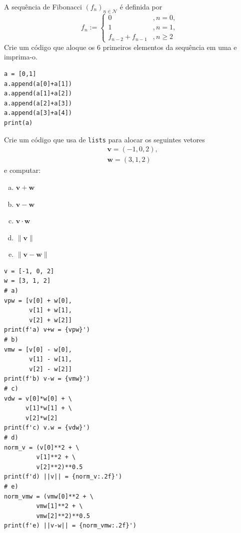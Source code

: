 \begin{exer}
  A sequência de Fibonacci{\fibonacci} $(f_n)_{n\in\mathcal{N}}$ é definida por
  \begin{equation}
    f_n := \left\{
    \begin{array}{ll}
      0 &, n=0,\\
      1 &, n=1,\\
      f_{n-2}+f_{n-1} &, n\geq 2
    \end{array}
  \right. 
\end{equation}
Crie um código que aloque os $6$ primeiros elementos da sequência em uma {\PYTHONlist} e imprima-o.
\end{exer}
\begin{resp}

\begin{lstlisting}
a = [0,1]
a.append(a[0]+a[1])
a.append(a[1]+a[2])
a.append(a[2]+a[3])
a.append(a[3]+a[4])
print(a)
\end{lstlisting}

\end{resp}

\begin{exer}
  Crie um código que usa de \texttt{lists} para alocar os seguintes vetores
  \begin{align}
    & \pmb{v} = (-1, 0, 2), \\
    & \pmb{w} = (3, 1, 2)
  \end{align}
  e computar:
  \begin{enumerate}[a)]
  \item $\pmb{v} + \pmb{w}$\\
  \item $\pmb{v} - \pmb{w}$\\
  \item $\pmb{v}\cdot \pmb{w}$\\
  \item $\|\pmb{v}\|$\\
  \item $\|\pmb{v} - \pmb{w}\|$
  \end{enumerate}
\end{exer}
\begin{resp}

\begin{lstlisting}
v = [-1, 0, 2]
w = [3, 1, 2]
# a)
vpw = [v[0] + w[0],
       v[1] + w[1],
       v[2] + w[2]]
print(f'a) v+w = {vpw}')
# b)
vmw = [v[0] - w[0],
       v[1] - w[1],
       v[2] - w[2]]
print(f'b) v-w = {vmw}')
# c)
vdw = v[0]*w[0] + \
      v[1]*w[1] + \
      v[2]*w[2]
print(f'c) v.w = {vdw}')
# d)
norm_v = (v[0]**2 + \
         v[1]**2 + \
         v[2]**2)**0.5
print(f'd) ||v|| = {norm_v:.2f}')
# e)
norm_vmw = (vmw[0]**2 + \
         vmw[1]**2 + \
         vmw[2]**2)**0.5
print(f'e) ||v-w|| = {norm_vmw:.2f}')
\end{lstlisting}

\end{resp}

